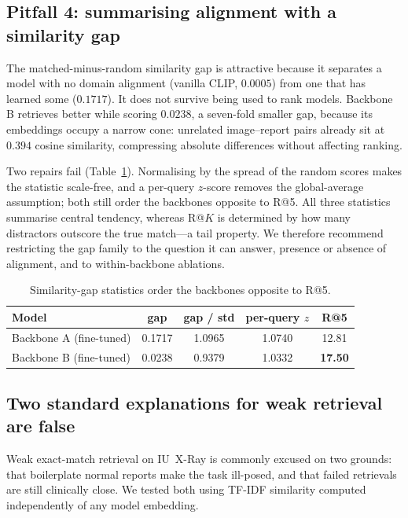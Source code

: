 \documentclass[runningheads]{llncs}
\begin{document}
\subsection{Pitfall 4: summarising alignment with a similarity gap}

The matched-minus-random similarity gap is attractive because it separates a
model with no domain alignment (vanilla CLIP, $0.0005$) from one that has learned
some ($0.1717$). It does not survive being used to rank models. Backbone B
retrieves better while scoring $0.0238$, a seven-fold smaller gap, because its
embeddings occupy a narrow cone: unrelated image--report pairs already sit at
$0.394$ cosine similarity, compressing absolute differences without affecting
ranking.

Two repairs fail (Table~\ref{tab:gap}). Normalising by the spread of the random
scores makes the statistic scale-free, and a per-query $z$-score removes the
global-average assumption; both still order the backbones opposite to R@5. All
three statistics summarise central tendency, whereas R@$K$ is determined by how
many distractors outscore the true match---a tail property. We therefore
recommend restricting the gap family to the question it can answer, presence or
absence of alignment, and to within-backbone ablations.

\begin{table}[t]
\centering
\caption{Similarity-gap statistics order the backbones opposite to R@5.}
\label{tab:gap}
\begin{tabular}{lcccc}
\toprule
Model & gap & gap / std & per-query $z$ & R@5 \\
\midrule
Backbone A (fine-tuned) & 0.1717 & 1.0965 & 1.0740 & 12.81 \\
Backbone B (fine-tuned) & 0.0238 & 0.9379 & 1.0332 & \textbf{17.50} \\
\bottomrule
\end{tabular}
\end{table}

\subsection{Two standard explanations for weak retrieval are false}

Weak exact-match retrieval on IU~X-Ray is commonly excused on two grounds: that
boilerplate normal reports make the task ill-posed, and that failed retrievals
are still clinically close. We tested both using TF-IDF similarity computed
independently of any model embedding.
\end{document}
